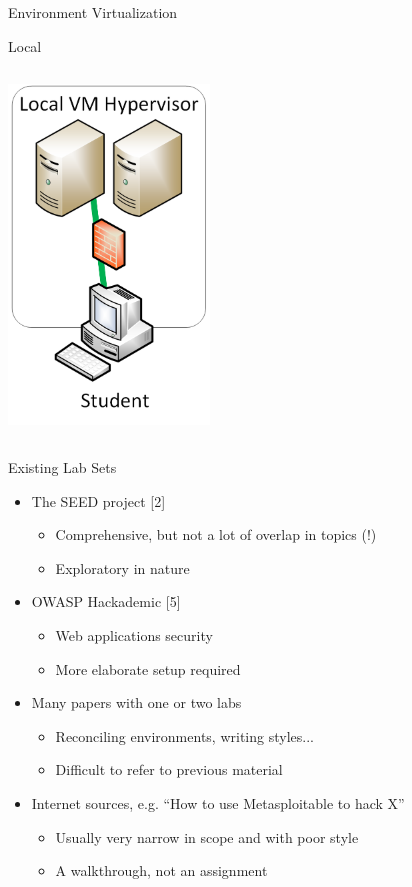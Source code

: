 \documentclass{beamer}
\begin{document}
\begin{frame}{Environment Virtualization}
\begin{block}{Local}
{\begin{columns}
            		\begin{column}{0.5\textwidth}
				\begin{center}
                 		\includegraphics[width=0.4\textwidth]{local-virt.png}
				\end{center}
              		\end{column}
            		\end{columns}		
			}	
		\end{block}		
	\end{frame}	
	
	\begin{frame}{Existing Lab Sets}
		\begin{itemize}	
			\item The SEED project [2]
			\begin{itemize}	
				\item Comprehensive, but not a lot of overlap in topics (!)
				\item Exploratory in nature
			\end{itemize}		
			\item OWASP Hackademic [5]
			\begin{itemize}	
				\item Web applications security
				\item More elaborate setup required
			\end{itemize}
			\item Many papers with one or two labs
			\begin{itemize}	
				\item Reconciling environments, writing styles...
				\item Difficult to refer to previous material
			\end{itemize}
			\item Internet sources, e.g. ``How to use Metasploitable to hack X''
			\begin{itemize}
				\item Usually very narrow in scope and with poor style
				\item A walkthrough, not an assignment
			\end{itemize}
		\end{itemize}	
	\end{frame}
	
\end{document}
